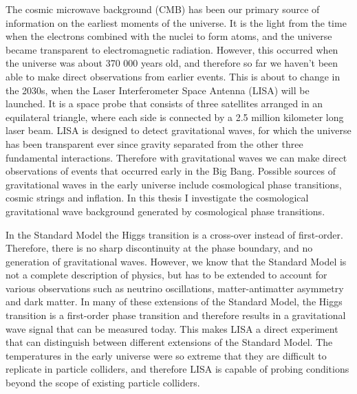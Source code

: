 The cosmic microwave background (CMB) has been our primary source of information on the earliest moments of the universe.
It is the light from the time when the electrons combined with the nuclei to form atoms,
and the universe became transparent to electromagnetic radiation.
However, this occurred when the universe was about 370 000 years old,
and therefore so far we haven't been able to make direct observations from earlier events.
This is about to change in the 2030s, when the Laser Interferometer Space Antenna (LISA) will be launched.
It is a space probe that consists of three satellites arranged in an equilateral triangle, where each side is connected by a 2.5 million kilometer long laser beam.
LISA is designed to detect gravitational waves,
for which the universe has been transparent ever since gravity separated from the other three fundamental interactions.
Therefore with gravitational waves we can make direct observations of events that occurred early in the Big Bang.
Possible sources of gravitational waves in the early universe include cosmological phase transitions, cosmic strings and inflation.
In this thesis I investigate the cosmological gravitational wave background generated by cosmological phase transitions.
\cites{lecture_notes}{lisa_2017}

In the Standard Model the Higgs transition is a cross-over instead of first-order.
Therefore, there is no sharp discontinuity at the phase boundary, and no generation of gravitational waves.
However, we know that the Standard Model is not a complete description of physics,
but has to be extended to account for various observations such as neutrino oscillations, matter-antimatter asymmetry and dark matter.
In many of these extensions of the Standard Model, the Higgs transition is a first-order phase transition
and therefore results in a gravitational wave signal that can be measured today.
This makes LISA a direct experiment that can distinguish between different extensions of the Standard Model.
The temperatures in the early universe were so extreme that they are difficult to replicate in particle colliders,
and therefore LISA is capable of probing conditions beyond the scope of existing particle colliders.
\cite{lecture_notes}

